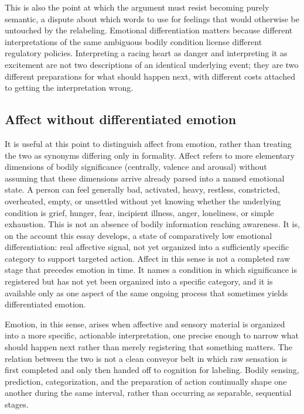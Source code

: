 \documentclass[11pt]{article}
\begin{document}
This is also the point at which the argument must resist becoming purely semantic, a dispute about which words to use for feelings that would otherwise be untouched by the relabeling. Emotional differentiation matters because different interpretations of the same ambiguous bodily condition license different regulatory policies. Interpreting a racing heart as danger and interpreting it as excitement are not two descriptions of an identical underlying event; they are two different preparations for what should happen next, with different costs attached to getting the interpretation wrong.

\subsection{Affect without differentiated emotion}

It is useful at this point to distinguish affect from emotion, rather than treating the two as synonyms differing only in formality. Affect refers to more elementary dimensions of bodily significance (centrally, valence and arousal) without assuming that these dimensions arrive already parsed into a named emotional state. A person can feel generally bad, activated, heavy, restless, constricted, overheated, empty, or unsettled without yet knowing whether the underlying condition is grief, hunger, fear, incipient illness, anger, loneliness, or simple exhaustion. This is not an absence of bodily information reaching awareness. It is, on the account this essay develops, a state of comparatively low emotional differentiation: real affective signal, not yet organized into a sufficiently specific category to support targeted action. Affect in this sense is not a completed raw stage that precedes emotion in time. It names a condition in which significance is registered but has not yet been organized into a specific category, and it is available only as one aspect of the same ongoing process that sometimes yields differentiated emotion.

Emotion, in this sense, arises when affective and sensory material is organized into a more specific, actionable interpretation, one precise enough to narrow what should happen next rather than merely registering that something matters. The relation between the two is not a clean conveyor belt in which raw sensation is first completed and only then handed off to cognition for labeling. Bodily sensing, prediction, categorization, and the preparation of action continually shape one another during the same interval, rather than occurring as separable, sequential stages.
\end{document}
